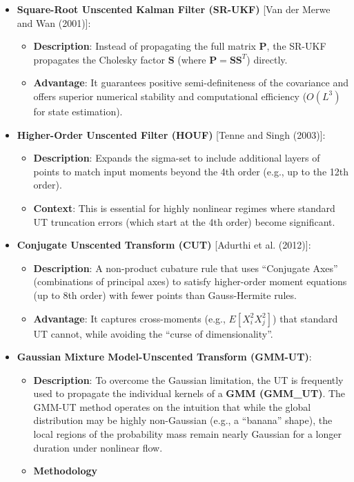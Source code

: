 \documentclass[
  letterpaper,
  DIV=11,
  numbers=noendperiod,
  oneside]{scrartcl}
\begin{document}
\begin{itemize}
\item
  \textbf{Square-Root Unscented Kalman Filter (SR-UKF)} {[}Van der Merwe
  and Wan (2001){]}:

  \begin{itemize}
  \item
    \textbf{Description}: Instead of propagating the full matrix
    \(\mathbf{P}\), the SR-UKF propagates the Cholesky factor
    \(\mathbf{S}\) (where \(\mathbf{P} = \mathbf{SS}^T\)) directly.
  \item
    \textbf{Advantage}: It guarantees positive semi-definiteness of the
    covariance and offers superior numerical stability and computational
    efficiency (\(O(L^3)\) for state estimation).
  \end{itemize}
\item
  \textbf{Higher-Order Unscented Filter (HOUF)} {[}Tenne and Singh
  (2003){]}:

  \begin{itemize}
  \item
    \textbf{Description}: Expands the sigma-set to include additional
    layers of points to match input moments beyond the 4th order (e.g.,
    up to the 12th order).
  \item
    \textbf{Context}: This is essential for highly nonlinear regimes
    where standard UT truncation errors (which start at the 4th order)
    become significant.
  \end{itemize}
\item
  \textbf{Conjugate Unscented Transform (CUT)} {[}Adurthi et al.
  (2012){]}:

  \begin{itemize}
  \item
    \textbf{Description}: A non-product cubature rule that uses
    ``Conjugate Axes'' (combinations of principal axes) to satisfy
    higher-order moment equations (up to 8th order) with fewer points
    than Gauss-Hermite rules.
  \item
    \textbf{Advantage}: It captures cross-moments (e.g.,
    \(E[X_i^2 X_j^2]\)) that standard UT cannot, while avoiding the
    ``curse of dimensionality''.
  \end{itemize}
\item
  \textbf{Gaussian Mixture Model-Unscented Transform (GMM-UT)}:

  \begin{itemize}
  \item
    \textbf{Description}: To overcome the Gaussian limitation, the UT is
    frequently used to propagate the individual kernels of a \textbf{GMM
    (GMM\_UT)}. The GMM-UT method operates on the intuition that while
    the global distribution may be highly non-Gaussian (e.g., a
    ``banana'' shape), the local regions of the probability mass remain
    nearly Gaussian for a longer duration under nonlinear flow.
  \item
    \textbf{Methodology}


\end{itemize}
\end{itemize}
\end{document}
